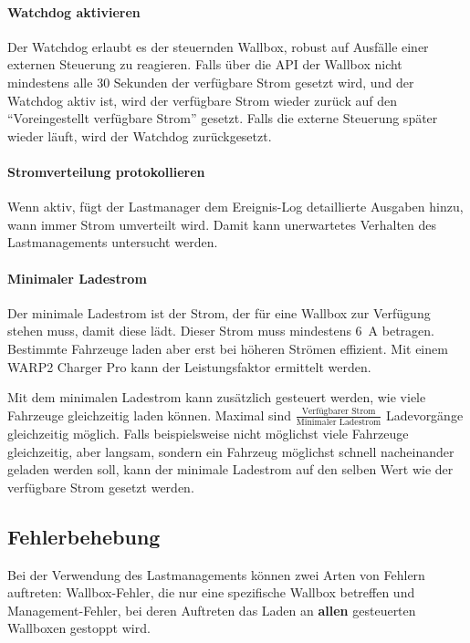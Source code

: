 \documentclass[a4paper,10pt]{article}
\begin{document}
\begin{multicols*}{2}
	\paragraph{Watchdog aktivieren}
	Der Watchdog erlaubt es der steuernden Wallbox, robust auf Ausfälle einer externen Steuerung zu reagieren. Falls über die API der Wallbox
	nicht mindestens alle 30 Sekunden der verfügbare Strom gesetzt wird, und der Watchdog aktiv ist, wird der verfügbare Strom wieder zurück auf den
	\enquote{Voreingestellt verfügbare Strom} gesetzt. Falls die externe Steuerung später wieder läuft, wird der Watchdog zurückgesetzt.

	\paragraph{Stromverteilung protokollieren}
	Wenn aktiv, fügt der Lastmanager dem Ereignis-Log detaillierte Ausgaben hinzu, wann immer Strom umverteilt wird. Damit kann unerwartetes Verhalten des
	Lastmanagements untersucht werden.

	\paragraph{Minimaler Ladestrom}
	Der minimale Ladestrom ist der Strom, der für eine Wallbox zur Verfügung stehen muss, damit diese lädt. Dieser Strom muss mindestens \SI{6}{\ampere} betragen.
	Bestimmte Fahrzeuge laden aber erst bei höheren Strömen effizient. Mit einem WARP2 Charger Pro kann der Leistungsfaktor ermittelt werden.

	Mit dem minimalen Ladestrom kann zusätzlich gesteuert werden, wie viele Fahrzeuge gleichzeitig laden können.
	Maximal sind $\frac{\text{Verfügbarer Strom}}{\text{Minimaler Ladestrom}}$ Ladevorgänge gleichzeitig möglich. Falls beispielsweise nicht möglichst viele
	Fahrzeuge gleichzeitig, aber langsam, sondern ein Fahrzeug möglichst schnell nacheinander geladen werden soll, kann der minimale Ladestrom auf den selben Wert
	wie der verfügbare Strom gesetzt werden.

	\subsection{Fehlerbehebung}
	Bei der Verwendung des Lastmanagements können zwei Arten von Fehlern auftreten: Wallbox-Fehler, die nur eine spezifische Wallbox betreffen und Management-Fehler,
	bei deren Auftreten das Laden an \textbf{allen} gesteuerten Wallboxen gestoppt wird.


\end{multicols*}
\end{document}
